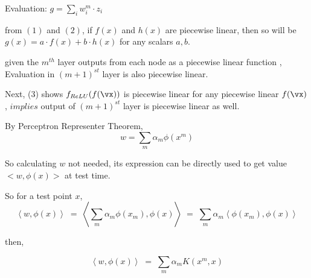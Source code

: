 \documentclass[a4paper,11pt]{article}
\begin{document}
\begin{mlsolution}
\begin{enumerate}
Evaluation:
$g = \sum_{i}{w^m_i \cdot z_i}$

from $(1)$ and $(2)$, if $f(x)$ and $h(x)$ are piecewise linear, then so will be $g(x) = a \cdot f(x) + b \cdot h(x)$ for any scalars $ a, b$.

given the $m^{th} $ layer outputs from each node as a piecewise linear function \iffalse (\textit{by induction hypothesis})\fi , Evaluation in $(m+1)^{st}$ layer is also piecewise linear.

Next, (3) shows $f_{ReLU} (f(\vx))$ is piecewise linear for any piecewise linear $f(\vx)$,
$implies$ output of $(m+1)^{st}$ layer is piecewise linear as well.



\end{enumerate}
\end{mlsolution}


\begin{mlsolution}

By Perceptron Representer Theorem, 
\[
    w = \sum_{m} \alpha_{m} \phi(x^{m})
\]

So calculating $w$ not needed, its expression can be directly used to get value $<w, \phi(x)>$ at test time.

So for a test point $x$,
\[
\left \langle w, \phi(x) \right \rangle \;= \;\left \langle \sum_{m} \alpha_{m} \phi(x_{m}), \phi(x)\right \rangle\;
            = \;\sum_{m} \alpha_{m} \left \langle \phi(x_{m}), \phi(x) \right \rangle
\]

then,

\[
\left \langle w, \phi(x) \right \rangle \;= \;\sum_{m} \alpha_{m} K( x^{m}, x)
\]

\end{mlsolution}
\end{document}
